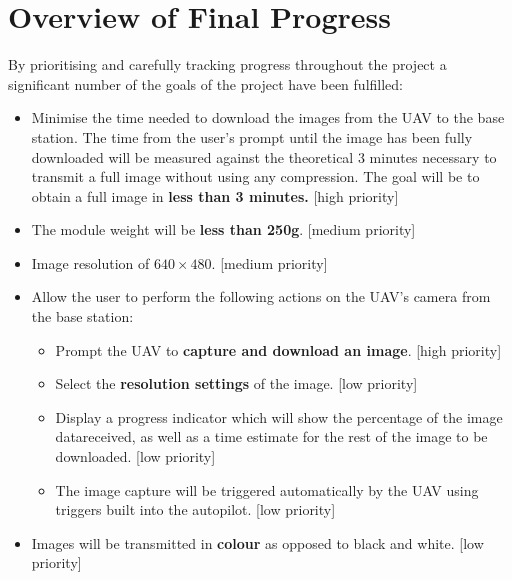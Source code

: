 \chapter{Overview of Final Progress}

By prioritising and carefully tracking progress throughout the
project a significant number of the goals of the project have been
fulfilled:


\begin{itemize}
	\item Minimise the time needed to download the images from the UAV to the base station. The time from the user’s prompt until the image has been fully downloaded will be measured against the theoretical 3 minutes necessary to transmit a full image without using any compression. The goal will be to obtain a full image in \textbf{less than 3 minutes.} [high priority]
	\item The module weight will be \textbf{less than 250g}. [medium priority]
	\item Image resolution of \textbf{$640\times480$}. [medium priority]
	\item Allow the user to perform the following actions on the UAV’s camera from the base station:
	\begin{itemize}
		\item Prompt the UAV to \textbf{capture and download an image}. [high priority]
		\item Select the \textbf{resolution settings} of the image. [low priority]
		\item Display a progress indicator which will show the percentage of the image datareceived, as well as a time estimate for the rest of the image to be downloaded. [low priority]
		\item The image capture will be triggered automatically by the UAV using triggers built into the autopilot. [low priority]
	\end{itemize}
	\item Images will be transmitted in \textbf{colour} as opposed to black and white. [low priority]
\end{itemize}

